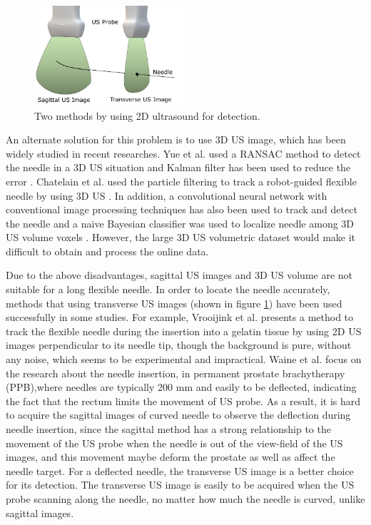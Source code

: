 \documentclass[journal,article,submit,moreauthors,pdftex]{Definitions/mdpi}
\begin{document}
\begin{figure}[H]
\centering
\includegraphics[width=0.5\textwidth]{figures/2/fz_1.pdf}
\captionsetup{width=12 cm,justification=centering}
\caption{Two methods by using 2D ultrasound for detection.}\label{fig:001}
\end{figure}

An alternate solution for this problem is to use 3D US image, which has been widely studied in recent researches.
Yue et al. used a RANSAC method to detect the needle in a 3D US situation and Kalman filter has been used to reduce the error \cite{Yue2012}.
Chatelain et al. used the particle filtering to track a robot-guided flexible needle by using 3D US \cite{Chatelain2015}.
In addition, a convolutional neural network with conventional image processing techniques has also been used to track and detect the needle \cite{Arif2019} and a naive Bayesian classifier was used to localize needle among 3D US volume voxels \cite{Younes2018a}.
However, the large 3D US volumetric dataset would make it difficult to obtain and process the online data.

Due to the above disadvantages, sagittal US images and 3D US volume are not suitable for a long flexible needle.
In order to locate the needle accurately, methods that using transverse US images (shown in figure \ref{fig:001}) have been used successfully in some studies.
For example, Vrooijink et al.\cite{GustaafJ.Vrooijink2013} presents a method to track the flexible needle during the insertion into a gelatin tissue by using 2D US images perpendicular to its needle tip, though the background is pure, without any noise, which seems to be experimental and impractical.
Waine et al.\cite{Waine2015b,Waine2016a,Waine2015c} focus on the research about the needle insertion, in permanent prostate brachytherapy (PPB),where needles are typically 200 mm and easily to be deflected, indicating the fact that the rectum limits the movement of US probe.
As a result, it is hard to acquire the sagittal images of curved needle to observe the deflection during needle insertion, since the sagittal method has a strong relationship to the movement of the US probe when the needle is out of the view-field of the US images, and this movement maybe deform the prostate as well as affect the needle target.
For a deflected needle, the transverse US image is a better choice for its detection.
The transverse US image is easily to be acquired when the US probe scanning along the needle, no matter how much the needle is curved, unlike sagittal images.
\end{document}
